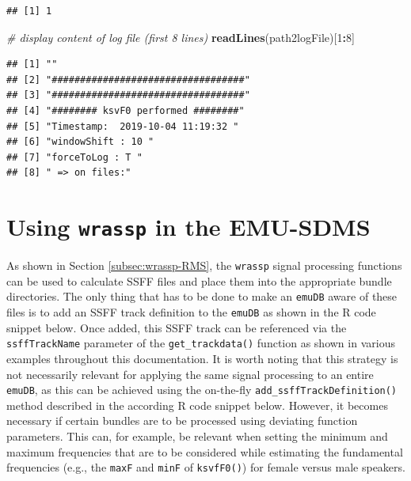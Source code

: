 \documentclass[]{book}
\newenvironment{Shaded}{\begin{snugshade}}{\end{snugshade}}
\newcommand{\CommentTok}[1]{\textcolor[rgb]{0.56,0.35,0.01}{\textit{#1}}}
\newcommand{\DecValTok}[1]{\textcolor[rgb]{0.00,0.00,0.81}{#1}}
\newcommand{\KeywordTok}[1]{\textcolor[rgb]{0.13,0.29,0.53}{\textbf{#1}}}
\newcommand{\NormalTok}[1]{#1}
\newcommand{\OperatorTok}[1]{\textcolor[rgb]{0.81,0.36,0.00}{\textbf{#1}}}
\begin{document}
\begin{verbatim}
## [1] 1
\end{verbatim}

\begin{Shaded}
\begin{Highlighting}[]
\CommentTok{# display content of log file (first 8 lines)}
\KeywordTok{readLines}\NormalTok{(path2logFile)[}\DecValTok{1}\OperatorTok{:}\DecValTok{8}\NormalTok{]}
\end{Highlighting}
\end{Shaded}

\begin{verbatim}
## [1] ""                                  
## [2] "##################################"
## [3] "##################################"
## [4] "######## ksvF0 performed ########" 
## [5] "Timestamp:  2019-10-04 11:19:32 "  
## [6] "windowShift : 10 "                 
## [7] "forceToLog : T "                   
## [8] " => on files:"
\end{verbatim}

\hypertarget{sec:wrassp-emu-sdms}{%
\section{\texorpdfstring{Using \texttt{wrassp} in the EMU-SDMS}{Using wrassp in the EMU-SDMS}}\label{sec:wrassp-emu-sdms}}

As shown in Section \ref{subsec:wrassp-RMS}, the \texttt{wrassp} signal processing functions can be used to calculate SSFF files and place them into the appropriate bundle directories. The only thing that has to be done to make an \texttt{emuDB} aware of these files is to add an SSFF track definition to the \texttt{emuDB} as shown in the R code snippet below. Once added, this SSFF track can be referenced via the \texttt{ssffTrackName} parameter of the \texttt{get\_trackdata()} function as shown in various examples throughout this documentation. It is worth noting that this strategy is not necessarily relevant for applying the same signal processing to an entire \texttt{emuDB}, as this can be achieved using the on-the-fly \texttt{add\_ssffTrackDefinition()} method described in the according R code snippet below. However, it becomes necessary if certain bundles are to be processed using deviating function parameters. This can, for example, be relevant when setting the minimum and maximum frequencies that are to be considered while estimating the fundamental frequencies (e.g., the \texttt{maxF} and \texttt{minF} of \texttt{ksvfF0()}) for female versus male speakers.
\end{document}
